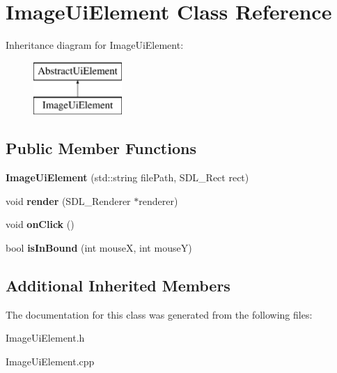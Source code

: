 \hypertarget{class_image_ui_element}{}\section{Image\+Ui\+Element Class Reference}
\label{class_image_ui_element}
Inheritance diagram for Image\+Ui\+Element\+:\begin{figure}[H]
\begin{center}
\leavevmode
\includegraphics[height=2.000000cm]{class_image_ui_element}
\end{center}
\end{figure}
\subsection*{Public Member Functions}
\begin{DoxyCompactItemize}
\item 
\mbox{\label{class_image_ui_element_aaa4540956ec81cef649694d1d45b28dd}} 
{\bfseries Image\+Ui\+Element} (std\+::string file\+Path, S\+D\+L\+\_\+\+Rect rect)
\item 
\mbox{\label{class_image_ui_element_a422fc1d3b4c1451f656e7470e575577b}} 
void {\bfseries render} (S\+D\+L\+\_\+\+Renderer $\ast$renderer)
\item 
\mbox{\label{class_image_ui_element_ab3c388de0807d86016a2ff43fd6d337e}} 
void {\bfseries on\+Click} ()
\item 
\mbox{\label{class_image_ui_element_a6d0f66cf68c5f035f5a9bfeaba3028f4}} 
bool {\bfseries is\+In\+Bound} (int mouseX, int mouseY)
\end{DoxyCompactItemize}
\subsection*{Additional Inherited Members}


The documentation for this class was generated from the following files\+:\begin{DoxyCompactItemize}
\item 
Image\+Ui\+Element.\+h\item 
Image\+Ui\+Element.\+cpp\end{DoxyCompactItemize}
